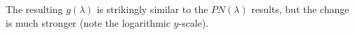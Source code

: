 \documentclass[onecolumn,fleqn,longbibliography]{revtex4}
\begin{document}
The resulting $g(\lambda)$ is strikingly similar to the $PN(\lambda)$ results,
but the change is much stronger (note the logarithmic $y$-scale).  


\begin{figure}[H]
  \\
\end{figure}
\end{document}
